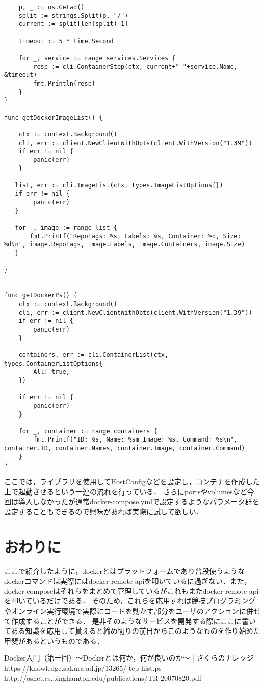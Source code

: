 \begin{verbatim}
    p, _ := os.Getwd()
    split := strings.Split(p, "/")
    current := split[len(split)-1]

    timeout := 5 * time.Second

    for _, service := range services.Services {
        resp := cli.ContainerStop(ctx, current+"_"+service.Name, &timeout)
        fmt.Println(resp)
    }
}

func getDockerImageList() {

    ctx := context.Background()
    cli, err := client.NewClientWithOpts(client.WithVersion("1.39"))
    if err != nil {
        panic(err)
    }

   list, err := cli.ImageList(ctx, types.ImageListOptions{})
   if err != nil {
        panic(err)
   }

   for _, image := range list {
       fmt.Printf("RepoTags: %s, Labels: %s, Container: %d, Size: %d\n", image.RepoTags, image.Labels, image.Containers, image.Size)
   }

}


func getDockerPs() {
    ctx := context.Background()
    cli, err := client.NewClientWithOpts(client.WithVersion("1.39"))
    if err != nil {
        panic(err)
    }

    containers, err := cli.ContainerList(ctx, types.ContainerListOptions{
        All: true,
    })

    if err != nil {
        panic(err)
    }

    for _, container := range containers {
        fmt.Printf("ID: %s, Name: %sm Image: %s, Command: %s\n", container.ID, container.Names, container.Image, container.Command)
    }
}
\end{verbatim}

ここでは，ライブラリを使用してHostConfigなどを設定し，コンテナを作成した上で起動させるという一連の流れを行っている．
さらにportsやvolumesなど今回は導入しなかったが通常docker-compose.ymlで設定するようなパラメータ群を設定することもできるので興味があれば実際に試して欲しい．

\section{おわりに}

ここで紹介したように，dockerとはプラットフォームであり普段使うようなdockerコマンドは実際にはdocker remote apiを叩いているに過ぎない．また，docker-composeはそれらをまとめて管理しているがこれもまたdocker remote apiを叩いているだけである．
そのため，これらを応用すれば競技プログラミングやオンライン実行環境で実際にコードを動かす部分をユーザのアクションに併せて作成することができる．
是非そのようなサービスを開発する際にここに書いてある知識を応用して貰えると締め切りの前日からこのようなものを作り始めた甲斐があるというものである．


\begin{thebibliography}{10}
     Docker入門（第一回）～Dockerとは何か，何が良いのか～ | さくらのナレッジ https://knowledge.sakura.ad.jp/13265/
     tcp-hist.ps http://osnet.cs.binghamton.edu/publications/TR-20070820.pdf
\end{thebibliography}
